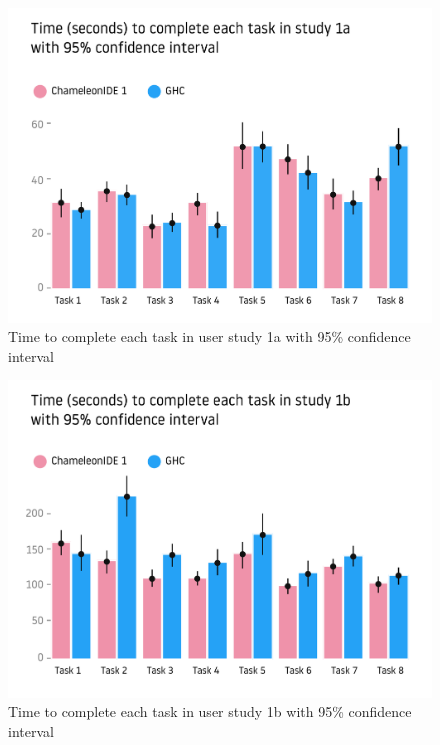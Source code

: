 
\begin{figure}[h]
    \centering
    \includegraphics[width=\linewidth]{images/user-study-1a.pdf}
    \caption{Time to complete each task in user study 1a with 95\% confidence interval}
    \label{fig:analysis-1a}
\end{figure}


\begin{figure}[h]
    \centering
    \includegraphics[width=\linewidth]{images/user-study-1b.pdf}
    \caption{Time to complete each task in user study 1b with 95\% confidence interval}
    \label{fig:analysis-1b}
\end{figure}

